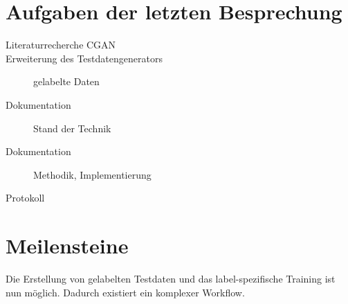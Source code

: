 
\newcommand{\Titel}{6. Protokoll}
\newcommand{\Teilnehmer}{Jonas Bürgel, Patrick Welter}
\newcommand{\DatumUndZeit}{21.02.2022 20:00-20:15}
\newcommand{\Ort}{Discord Meeting}
\newcommand{\Thema}{Erweiterung GAN: Einführung gelabelte Daten}


\section{Aufgaben der letzten Besprechung}
\begin{description}
	\item[Literaturrecherche CGAN]  \halfcheck
	\item[Erweiterung des Testdatengenerators] gelabelte Daten  \fullcheck
	\item[Dokumentation] Stand der Technik  \fullcheck
	\item[Dokumentation] Methodik, Implementierung  \halfcheck
	\item[Protokoll]  \fullcheck
\end{description}

\section{Meilensteine}
\begin{description}[style=nextline]
	\item[Komplexer Trainingsworkflow mit gelabelten Daten \hfill \fullcheck]
	Die Erstellung von gelabelten Testdaten und das label-spezifische Training ist nun möglich.
	Dadurch existiert ein komplexer Workflow.
\end{description}

